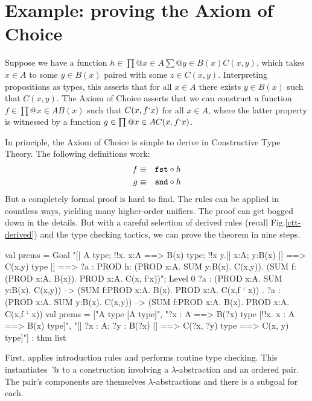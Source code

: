 \section{Example: proving the Axiom of Choice} \label{ctt-choice}
Suppose we have a function $h\in \prod@{x\in A}\sum@{y\in B(x)} C(x,y)$,
which takes $x\in A$ to some $y\in B(x)$ paired with some $z\in C(x,y)$.
Interpreting propositions as types, this asserts that for all $x\in A$
there exists $y\in B(x)$ such that $C(x,y)$.  The Axiom of Choice asserts
that we can construct a function $f\in \prod@{x\in A}B(x)$ such that
$C(x,f{\tt`}x)$ for all $x\in A$, where the latter property is witnessed by a
function $g\in \prod@{x\in A}C(x,f{\tt`}x)$.

In principle, the Axiom of Choice is simple to derive in Constructive Type
Theory.  The following definitions work:
\begin{eqnarray*}
    f & \equiv & {\tt fst} \circ h \\
    g & \equiv & {\tt snd} \circ h
\end{eqnarray*}
But a completely formal proof is hard to find.  The rules can be applied in
countless ways, yielding many higher-order unifiers.  The proof can get
bogged down in the details.  But with a careful selection of derived rules
(recall Fig.\ts\ref{ctt-derived}) and the type checking tactics, we can
prove the theorem in nine steps.
\begin{ttbox}
val prems = Goal
    "[| A type;  !!x. x:A ==> B(x) type;                    \ttback
\ttback       !!x y.[| x:A;  y:B(x) |] ==> C(x,y) type            \ttback
\ttback    |] ==> ?a : PROD h: (PROD x:A. SUM y:B(x). C(x,y)).    \ttback
\ttback                     (SUM f: (PROD x:A. B(x)). PROD x:A. C(x, f`x))";
{\out Level 0}
{\out ?a : (PROD x:A. SUM y:B(x). C(x,y)) -->}
{\out      (SUM f:PROD x:A. B(x). PROD x:A. C(x,f ` x))}
{. ?a : (PROD x:A. SUM y:B(x). C(x,y)) -->}
{\out          (SUM f:PROD x:A. B(x). PROD x:A. C(x,f ` x))}
\ttbreak
{\out val prems = ["A type  [A type]",}
{\out              "?x : A ==> B(?x) type  [!!x. x : A ==> B(x) type]",}
{\out              "[| ?x : A; ?y : B(?x) |] ==> C(?x, ?y) type}
{\out               [!!x y. [| x : A; y : B(x) |] ==> C(x, y) type]"]}
{\out             : thm list}
\end{ttbox}
First,  applies introduction rules and performs routine
type checking.  This instantiates~${?\!a}$ to a construction involving
a $\lambda$-abstraction and an ordered pair.  The pair's components are
themselves $\lambda$-abstractions and there is a subgoal for each.
